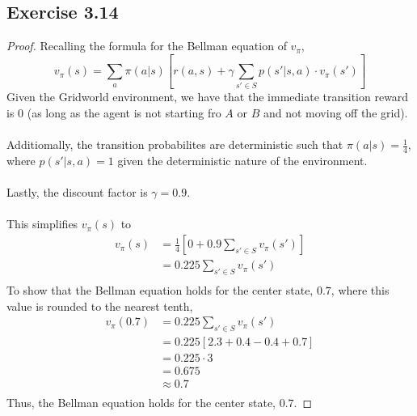 \documentclass{article}
\begin{document}
\subsection*{Exercise 3.14}
\begin{proof}
    \renewcommand{\qedsymbol}{$\blacksquare$}
        Recalling the formula for the Bellman equation of $v_{\pi}$,
    \begin{equation*}
        v_{\pi}(s) = \sum_{a} \pi(a|s) \left[r(a,s) + \gamma \sum_{s'\in S} p(s'|s,a)\cdot v_{\pi}(s')\right]
    \end{equation*}
    Given the Gridworld environment, we have that the immediate transition reward is $0$ (as long as the agent is not starting fro $A$ or $B$ and not moving off the grid).\\\\
    Additiomally, the transition probabilites are deterministic such that $\pi(a|s)=\frac{1}{4}$, where $p(s'|s,a)=1$ given the deterministic nature of the environment.\\\\
    Lastly, the discount factor is $\gamma=0.9$.\\\\
    This simplifies $v_{\pi}(s)$ to
    \begin{equation*}
        \begin{aligned}
            v_{\pi}(s) &= \frac{1}{4} \left[0 + 0.9 \sum_{s'\in S} v_{\pi}(s')\right]\\
            &= 0.225 \sum_{s'\in S} v_{\pi}(s')\\
        \end{aligned}
    \end{equation*}
    To show that the Bellman equation holds for the center state, $0.7$, where this value is rounded to the nearest tenth,
    \begin{equation*}
        \begin{aligned}
            v_{\pi}(0.7) &= 0.225 \sum_{s'\in S} v_{\pi}(s')\\
            &= 0.225 \left[2.3 + 0.4 - 0.4 + 0.7\right]\\
            &= 0.225 \cdot 3\\
            &= 0.675\\
            &\approx 0.7\\
        \end{aligned}
    \end{equation*}
    Thus, the Bellman equation holds for the center state, $0.7$.\par 
\end{proof}
\end{document}
